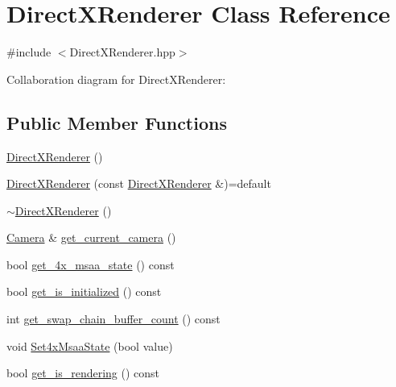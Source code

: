 \hypertarget{class_direct_x_renderer}{}\section{Direct\+X\+Renderer Class Reference}
\label{class_direct_x_renderer}


{\ttfamily \#include $<$Direct\+X\+Renderer.\+hpp$>$}



Collaboration diagram for Direct\+X\+Renderer\+:
\subsection*{Public Member Functions}
\begin{DoxyCompactItemize}
\item 
\hyperlink{class_direct_x_renderer_aa97de1a7bf6c0ddb50da1c2cfc6f7e79_aa97de1a7bf6c0ddb50da1c2cfc6f7e79}{Direct\+X\+Renderer} ()
\item 
\hyperlink{class_direct_x_renderer_a1e88177699a82174ff2ba8e5b2a7570b_a1e88177699a82174ff2ba8e5b2a7570b}{Direct\+X\+Renderer} (const \hyperlink{class_direct_x_renderer}{Direct\+X\+Renderer} \&)=default
\item 
\hyperlink{class_direct_x_renderer_a1a4b9b622e6a78883da21db9ef4a121e_a1a4b9b622e6a78883da21db9ef4a121e}{$\sim$\+Direct\+X\+Renderer} ()
\item 
\hyperlink{class_camera}{Camera} \& \hyperlink{class_direct_x_renderer_a8232561ca218d26c0f70d9f9b3dbcea6_a8232561ca218d26c0f70d9f9b3dbcea6}{get\+\_\+current\+\_\+camera} ()
\item 
bool \hyperlink{class_direct_x_renderer_a99c49dd436c922c8f21b1839b0fb6bd1_a99c49dd436c922c8f21b1839b0fb6bd1}{get\+\_\+4x\+\_\+msaa\+\_\+state} () const 
\item 
bool \hyperlink{class_direct_x_renderer_a58d1ad36aeb981fd9ca698fc2215dc10_a58d1ad36aeb981fd9ca698fc2215dc10}{get\+\_\+is\+\_\+initialized} () const 
\item 
int \hyperlink{class_direct_x_renderer_a6d696829e35fe480381db6b759fe8ca2_a6d696829e35fe480381db6b759fe8ca2}{get\+\_\+swap\+\_\+chain\+\_\+buffer\+\_\+count} () const 
\item 
void \hyperlink{class_direct_x_renderer_a252d9ba8d713ba462c54a3dadfda2f59_a252d9ba8d713ba462c54a3dadfda2f59}{Set4x\+Msaa\+State} (bool value)
\item 
bool \hyperlink{class_direct_x_renderer_aceda888b20469930d5a99edc842d21a6_aceda888b20469930d5a99edc842d21a6}{get\+\_\+is\+\_\+rendering} () const 

\end{DoxyCompactItemize}
